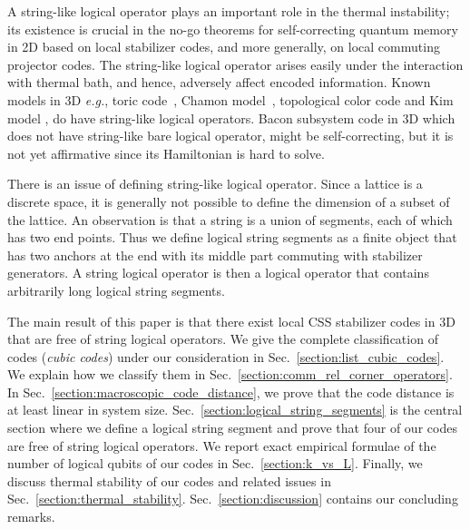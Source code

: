 \documentclass[letterpaper,10pt,pra,aps,showpacs,twocolumn]{revtex4-1}
\theoremstyle{definition} \newtheorem{defn}{Definition}
\theoremstyle{definition} \newtheorem{remark}{Remark}
\begin{document}
A string-like logical operator plays an important role in the thermal instability; its existence is crucial in the no-go theorems \cite{BravyiTerhal2008no-go, KayColbeck2008Quantum, HaahPreskill2010Logical} for self-correcting quantum memory in 2D based on local stabilizer codes, and more generally, on local commuting projector codes. The string-like logical operator arises easily under the interaction with thermal bath, and hence, adversely affect encoded information. Known models in 3D \emph{e.g.}, toric code~\cite{NussinovOrtiz2007Autocorrelations, CastelnovoChamon2008Topological}, Chamon model~\cite{Chamon2005Quantum}, topological color code \cite{BombinMartin-Delgado2007Exact} and Kim model \cite{Kim2010Exactly}, do have string-like logical operators. Bacon subsystem code in 3D \cite{Bacon2006Operator} which does not have string-like bare logical operator, might be self-correcting, but it is not yet affirmative since its Hamiltonian is hard to solve.

There is an issue of defining string-like logical operator. Since a lattice is a discrete space, it is generally not possible to define the dimension of a subset of the lattice. An observation is that a string is a union of segments, each of which has two end points. Thus we define logical string segments as a finite object that has two anchors at the end with its middle part commuting with stabilizer generators. A string logical operator is then a logical operator that contains arbitrarily long logical string segments.

The main result of this paper is that there exist local CSS stabilizer codes in 3D that are free of string logical operators. We give the complete classification of codes (\emph{cubic codes}) under our consideration in Sec.~\ref{section:list_cubic_codes}. We explain how we classify them in Sec.~\ref{section:comm_rel_corner_operators}. In Sec.~\ref{section:macroscopic_code_distance}, we prove that the code distance is at least linear in system size. Sec.~\ref{section:logical_string_segments} is the central section where we define a logical string segment and prove that four of our codes are free of string logical operators. We report exact empirical formulae of the number of logical qubits of our codes in Sec.~\ref{section:k_vs_L}. Finally, we discuss thermal stability of our codes and related issues in Sec.~\ref{section:thermal_stability}. Sec.~\ref{section:discussion} contains our concluding remarks.

\end{document}
